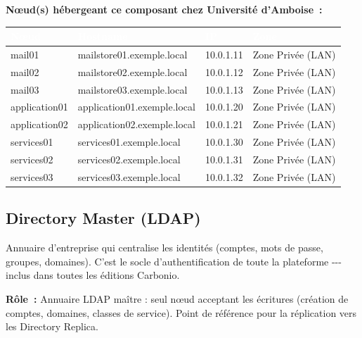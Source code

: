 \documentclass[11pt,a4paper]{report}
\newcommand{\tblhead}[1]{\textcolor{white}{\textbf{#1}}}
\begin{document}
\textbf{Nœud(s) hébergeant ce composant chez Université d'Amboise~:}
\begin{longtable}{|p{3.2cm}|p{4.5cm}|p{3.2cm}|p{2.3cm}|}
\hline
\rowcolor{primary}\tblhead{Nœud} & \tblhead{Hostname} & \tblhead{IP} & \tblhead{Zone} \\
\hline
\endhead
mail01 & mailstore01.\allowbreak{}exemple.\allowbreak{}local & 10.\allowbreak{}0.\allowbreak{}1.\allowbreak{}11 & Zone Privée (LAN) \\
\hline
mail02 & mailstore02.\allowbreak{}exemple.\allowbreak{}local & 10.\allowbreak{}0.\allowbreak{}1.\allowbreak{}12 & Zone Privée (LAN) \\
\hline
mail03 & mailstore03.\allowbreak{}exemple.\allowbreak{}local & 10.\allowbreak{}0.\allowbreak{}1.\allowbreak{}13 & Zone Privée (LAN) \\
\hline
application01 & application01.\allowbreak{}exemple.\allowbreak{}local & 10.\allowbreak{}0.\allowbreak{}1.\allowbreak{}20 & Zone Privée (LAN) \\
\hline
application02 & application02.\allowbreak{}exemple.\allowbreak{}local & 10.\allowbreak{}0.\allowbreak{}1.\allowbreak{}21 & Zone Privée (LAN) \\
\hline
services01 & services01.\allowbreak{}exemple.\allowbreak{}local & 10.\allowbreak{}0.\allowbreak{}1.\allowbreak{}30 & Zone Privée (LAN) \\
\hline
services02 & services02.\allowbreak{}exemple.\allowbreak{}local & 10.\allowbreak{}0.\allowbreak{}1.\allowbreak{}31 & Zone Privée (LAN) \\
\hline
services03 & services03.\allowbreak{}exemple.\allowbreak{}local & 10.\allowbreak{}0.\allowbreak{}1.\allowbreak{}32 & Zone Privée (LAN) \\
\hline
\end{longtable}


\subsection{Directory Master (LDAP)}

Annuaire d'entreprise qui centralise les identités (comptes, mots de passe, groupes, domaines).\allowbreak{} C'est le socle d'authentification de toute la plateforme -\allowbreak{}-\allowbreak{}-\allowbreak{} inclus dans toutes les éditions Carbonio.\allowbreak{}

\textbf{Rôle~:} Annuaire LDAP maître : seul nœud acceptant les écritures (création de comptes, domaines, classes de service).\allowbreak{} Point de référence pour la réplication vers les Directory Replica.\allowbreak{}
\end{document}
